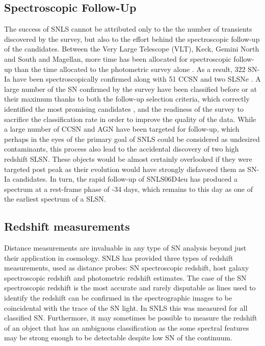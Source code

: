 \subsection{Spectroscopic Follow-Up}
The success of SNLS cannot be attributed only to the the number of transients discovered by the survey, but also to the effort behind the spectroscopic follow-up of the candidates. Between the Very Large Telescope (VLT), Keck, Gemini North and South and Magellan, more time has been allocated for spectroscopic follow-up than the time allocated to the photometric survey alone \citep{Pritchet2004}. As a result, 322 SN-Ia have been spectroscopically confirmed along with 51 CCSN and two SLSNe \citep{Guy2010,Howell2005,Howell2013}. A large number of the SN confirmed by the survey have been classified before or at their maximum thanks to both the follow-up selection criteria, which correctly identified the most promising candidates \citep{Sullivan2006}, and the readiness of the survey to sacrifice the classification rate in order to improve the quality of the data. While a large number of CCSN and AGN have been targeted for follow-up, which perhaps in the eyes of the primary goal of SNLS could be considered as undesired contaminants, this process also lead to the accidental discovery of two high redshift SLSN. These objects would be almost certainly overlooked if they were targeted post peak as their evolution would have strongly disfavored them as SN-Ia candidates. In turn, the rapid follow-up of SNLS06D4eu has produced a spectrum at a rest-frame phase of -34 days, which remains to this day as one of the earliest spectrum of a SLSN.

\subsection{Redshift measurements}
Distance measurements are invaluable in any type of SN analysis beyond just their application in cosmology. SNLS has provided three types of redshift measurements, used as distance probes: SN spectroscopic redshift, host galaxy spectroscopic redshift and photometric redshift estimates. The case of the SN spectroscopic redshift is the most accurate and rarely disputable as lines used to identify the redshift can be confirmed in the spectrographic images to be coincidental with the trace of the SN light. In SNLS this was measured for all classified SN. Furthermore, it may sometimes be possible to measure the redshift of an object that has an ambiguous classification as the some spectral features may be strong enough to be detectable despite low S\/N of the continuum.

